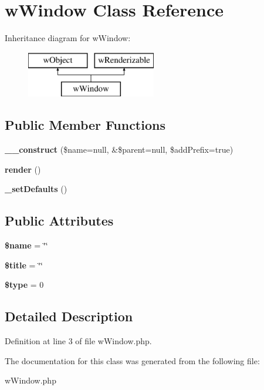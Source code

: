 \hypertarget{classwWindow}{
\section{wWindow Class Reference}
\label{classwWindow}
}
Inheritance diagram for wWindow:\begin{figure}[H]
\begin{center}
\leavevmode
\includegraphics[height=2.000000cm]{classwWindow}
\end{center}
\end{figure}
\subsection*{Public Member Functions}
\begin{DoxyCompactItemize}
\item 
\hypertarget{classwWindow_a86d32d44e921532279470c74f25cb192}{
{\bfseries \_\-\_\-construct} (\$name=null, \&\$parent=null, \$addPrefix=true)}
\label{classwWindow_a86d32d44e921532279470c74f25cb192}

\item 
\hypertarget{classwWindow_ae571fa5f25b5a200559152153fd0414d}{
{\bfseries render} ()}
\label{classwWindow_ae571fa5f25b5a200559152153fd0414d}

\item 
\hypertarget{classwWindow_a066bca3555dce86d7f9d18fbe3d7fc4f}{
{\bfseries \_\-setDefaults} ()}
\label{classwWindow_a066bca3555dce86d7f9d18fbe3d7fc4f}

\end{DoxyCompactItemize}
\subsection*{Public Attributes}
\begin{DoxyCompactItemize}
\item 
\hypertarget{classwWindow_a5b70c9b41159c1e8ddef1121b0c75d7d}{
{\bfseries \$name} = \char`\"{}\char`\"{}}
\label{classwWindow_a5b70c9b41159c1e8ddef1121b0c75d7d}

\item 
\hypertarget{classwWindow_a3fcc1893184df1d10cbf1c99cdd0153b}{
{\bfseries \$title} = \char`\"{}\char`\"{}}
\label{classwWindow_a3fcc1893184df1d10cbf1c99cdd0153b}

\item 
\hypertarget{classwWindow_aa19fc63dfefc91b456b74f0253806085}{
{\bfseries \$type} = 0}
\label{classwWindow_aa19fc63dfefc91b456b74f0253806085}

\end{DoxyCompactItemize}


\subsection{Detailed Description}


Definition at line 3 of file wWindow.php.



The documentation for this class was generated from the following file:\begin{DoxyCompactItemize}
\item 
wWindow.php\end{DoxyCompactItemize}
